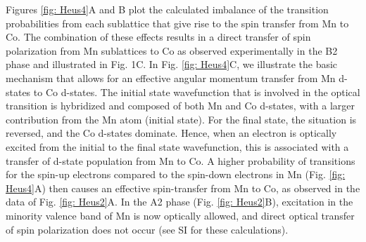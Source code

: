 Figures \ref{fig: Heus4}A and B plot the calculated imbalance of the transition probabilities from each sublattice that give rise to the spin transfer from Mn to Co. The combination of these effects results in a direct transfer of spin polarization from Mn sublattices to Co as observed experimentally in the B2 phase and illustrated in Fig. 1C. In Fig. \ref{fig: Heus4}C, we illustrate the basic mechanism that allows for an effective angular momentum transfer from Mn d-states to Co d-states. The initial state wavefunction that is involved in the optical transition is hybridized and composed of both Mn and Co d-states, with a larger contribution from the Mn atom (initial state). For the final state, the situation is reversed, and the Co d-states dominate. Hence, when an electron is optically excited from the initial to the final state wavefunction, this is associated with a transfer of d-state population from Mn to Co. A higher probability of transitions for the spin-up electrons compared to the spin-down electrons in Mn (Fig. \ref*{fig: Heus4}A) then causes an effective spin-transfer from Mn to Co, as observed in the data of Fig. \ref{fig: Heus2}A. In the A2 phase (Fig. \ref{fig: Heus2}B), excitation in the minority valence band of Mn is now optically allowed, and direct optical transfer of spin polarization does not occur (see SI for these calculations).

